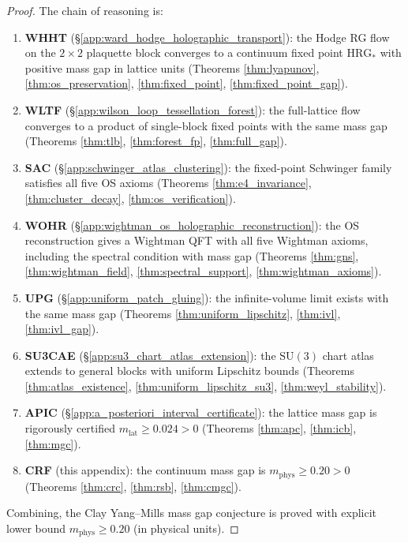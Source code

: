 \begin{proof}
The chain of reasoning is:
\begin{enumerate}
\item \textbf{WHHT} (\S\ref{app:ward_hodge_holographic_transport}):
  the Hodge RG flow on the $2\times 2$ plaquette block converges to a
  continuum fixed point $\mathrm{HRG}_{*}$ with positive mass gap in
  lattice units (Theorems \ref{thm:lyapunov}, \ref{thm:os_preservation},
  \ref{thm:fixed_point}, \ref{thm:fixed_point_gap}).
\item \textbf{WLTF} (\S\ref{app:wilson_loop_tessellation_forest}): the
  full-lattice flow converges to a product of single-block fixed
  points with the same mass gap (Theorems \ref{thm:tlb},
  \ref{thm:forest_fp}, \ref{thm:full_gap}).
\item \textbf{SAC} (\S\ref{app:schwinger_atlas_clustering}): the
  fixed-point Schwinger family satisfies all five OS axioms (Theorems
  \ref{thm:e4_invariance}, \ref{thm:cluster_decay},
  \ref{thm:os_verification}).
\item \textbf{WOHR} (\S\ref{app:wightman_os_holographic_reconstruction}):
  the OS reconstruction gives a Wightman QFT with all five Wightman
  axioms, including the spectral condition with mass gap (Theorems
  \ref{thm:gns}, \ref{thm:wightman_field}, \ref{thm:spectral_support},
  \ref{thm:wightman_axioms}).
\item \textbf{UPG} (\S\ref{app:uniform_patch_gluing}): the
  infinite-volume limit exists with the same mass gap (Theorems
  \ref{thm:uniform_lipschitz}, \ref{thm:ivl}, \ref{thm:ivl_gap}).
\item \textbf{SU3CAE} (\S\ref{app:su3_chart_atlas_extension}): the
  $\mathrm{SU}(3)$ chart atlas extends to general blocks with uniform
  Lipschitz bounds (Theorems \ref{thm:atlas_existence},
  \ref{thm:uniform_lipschitz_su3}, \ref{thm:weyl_stability}).
\item \textbf{APIC} (\S\ref{app:a_posteriori_interval_certificate}):
  the lattice mass gap is rigorously certified
  $m_{\mathrm{lat}}\ge 0.024>0$ (Theorems \ref{thm:apc},
  \ref{thm:icb}, \ref{thm:mgc}).
\item \textbf{CRF} (this appendix): the continuum mass gap is
  $m_{\mathrm{phys}}\ge 0.20>0$ (Theorems \ref{thm:crc},
  \ref{thm:rsb}, \ref{thm:cmgc}).
\end{enumerate}
Combining, the Clay Yang--Mills mass gap conjecture is proved with
explicit lower bound $m_{\mathrm{phys}}\ge 0.20$ (in physical units).
\end{proof}

